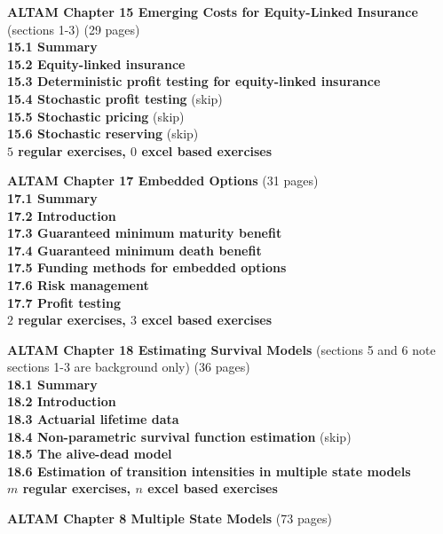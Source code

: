 \documentclass[hidelinks, 12pt]{article}
\theoremstyle{mydefstyle}
\theoremstyle{mythmstyle}
\begin{document}
\textbf{ALTAM Chapter 15 Emerging Costs for Equity-Linked Insurance} (sections 1-3) (29 pages) \\
\textbf{15.1 Summary} \\
\textbf{15.2 Equity-linked insurance} \\
\textbf{15.3 Deterministic profit testing for equity-linked insurance} \\
\textbf{15.4 Stochastic profit testing} (skip) \\
\textbf{15.5 Stochastic pricing} (skip) \\
\textbf{15.6 Stochastic reserving} (skip) \\
\textbf{$5$ regular exercises, $0$ excel based exercises}

\textbf{ALTAM Chapter 17 Embedded Options} (31 pages) \\
\textbf{17.1 Summary} \\
\textbf{17.2 Introduction} \\
\textbf{17.3 Guaranteed minimum maturity benefit} \\
\textbf{17.4 Guaranteed minimum death benefit} \\
\textbf{17.5 Funding methods for embedded options} \\
\textbf{17.6 Risk management} \\
\textbf{17.7 Profit testing} \\
\textbf{$2$ regular exercises, $3$ excel based exercises}

\textbf{ALTAM Chapter 18 Estimating Survival Models} (sections 5 and 6 note sections 1-3 are background only) (36 pages) \\
\textbf{18.1 Summary} \\
\textbf{18.2 Introduction} \\
\textbf{18.3 Actuarial lifetime data} \\
\textbf{18.4 Non-parametric survival function estimation} (skip) \\
\textbf{18.5 The alive-dead model} \\
\textbf{18.6 Estimation of transition intensities in multiple state models} \\
\textbf{$m$ regular exercises, $n$ excel based exercises}

\newpage

\begin{center}
\textbf{ALTAM Chapter 8 Multiple State Models} (73 pages)
\end{center}
\end{document}
